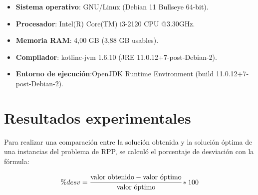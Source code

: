 \documentclass[11pt]{article}
\begin{document}
\begin{itemize}
   \item \textbf{Sistema operativo}: GNU/Linux (Debian 11 Bullseye 64-bit).
   \item \textbf{Procesador}: Intel(R) Core(TM) i3-2120 CPU @3.30GHz.
   \item \textbf{Memoria RAM}: 4,00 GB (3,88 GB usables).
   \item \textbf{Compilador}: kotlinc-jvm 1.6.10 (JRE 11.0.12+7-post-Debian-2).
   \item \textbf{Entorno de ejecución}:OpenJDK Runtime Environment (build 11.0.12+7-post-Debian-2).
\end{itemize}

\section{Resultados experimentales}

Para realizar una comparación entre la solución obtenida y la solución óptima de una instancias
del problema de RPP, se calculó el porcentaje de desviación con la fórmula:

\begin{equation}
    \%desv = \cfrac{\text{valor obtenido} - \text{valor óptimo}}{\text{valor óptimo}} *100
\end{equation}
\end{document}
